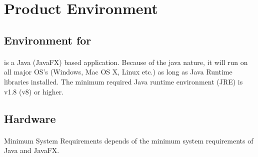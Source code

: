 \section{Product Environment}
\subsection{Environment for \app{}}
\paragraph{}\app{} is a Java (JavaFX) based application. Because of the java nature, it will run on all major OS's (Windows, Mac OS X, Linux etc.) as long as Java Runtime libraries installed. The minimum required Java runtime environment (JRE) is v1.8 (v8) or higher.

\subsection{Hardware}
\paragraph{}Minimum System Requirements depends of the minimum system requirements of Java and JavaFX.
